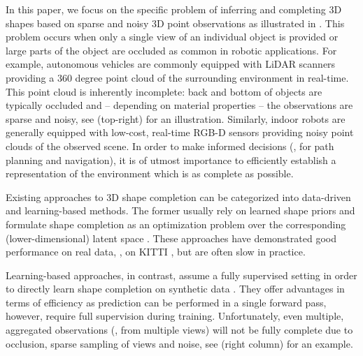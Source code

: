 In this paper, we focus on the specific problem of inferring and completing 3D shapes based on sparse and  noisy 3D point observations as illustrated in . This problem occurs when only a single view of an individual object is provided or large parts of the object are occluded as common in robotic applications. For example, autonomous vehicles are commonly equipped with LiDAR scanners providing a 360 degree point cloud of the surrounding environment in real-time. This point cloud is inherently incomplete: back and bottom of objects are typically occluded and -- depending on material properties -- the observations are sparse and noisy, see  (top-right) for an illustration. Similarly, indoor robots are generally equipped with low-cost, real-time RGB-D sensors providing noisy point clouds of the observed scene. In order to make informed decisions (\eg, for path planning and navigation), it is of utmost importance to efficiently establish a representation of the environment which is as complete as possible.

Existing approaches to 3D shape completion can be categorized into data-driven and learning-based methods. The former usually rely on learned shape priors and formulate shape completion as an optimization problem over the corresponding (lower-dimensional) latent space \citep{Rock2015CVPR,Haene2014CVPR,Li2015CGF,Engelmann2016GCPR,Nan2012TG,Bao2013CVPR,Dame2013CVPR,Ngyuen2016CVPR}. These approaches have demonstrated good performance on real data, \eg, on KITTI \citep{Geiger2012CVPR}, but are often slow in practice.

Learning-based approaches, in contrast, assume a fully supervised setting in order to directly learn shape completion on synthetic data \citep{Riegler2017THREEDV,Smith2017ARXIV,Dai2017CVPRa,Sharma2016ARXIV,Fan2017CVPR,Rezende2016ARXIV,Yang2018ARXIVb,Wang2017ICCV,Varley2017IROS,Han2017ICCV}. They offer advantages in terms of efficiency as prediction can be performed in a single forward pass, however, require full supervision during training. Unfortunately, even multiple, aggregated observations (\eg, from multiple views) will not be fully complete due to occlusion, sparse sampling of views and noise, see  (right column) for an example.

